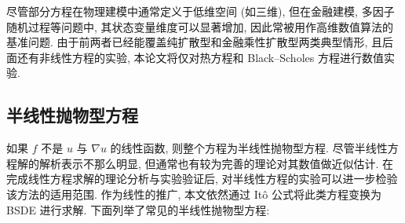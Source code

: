       尽管部分方程在物理建模中通常定义于低维空间 (如三维), 但在金融建模, 多因子随机过程等问题中,
      其状态变量维度可以显著增加, 因此常被用作高维数值算法的基准问题.
      由于前两者已经能覆盖纯扩散型和金融乘性扩散型两类典型情形, 且后面还有非线性方程的实验,
      本论文将仅对热方程和 Black--Scholes 方程进行数值实验.

    \subsection{半线性抛物型方程}\label{subsec:slppde}
      如果 $f$ 不是 $u$ 与 $\nabla u$ 的线性函数, 则整个方程为半线性抛物型方程.
      尽管半线性方程解的解析表示不那么明显, 但通常也有较为完善的理论对其数值做近似估计.
      在完成线性方程求解的理论分析与实验验证后, 对半线性方程的实验可以进一步检验该方法的适用范围.
      作为线性的推广, 本文依然通过 Itô 公式将此类方程变换为 BSDE 进行求解.
      下面列举了常见的半线性抛物型方程:

